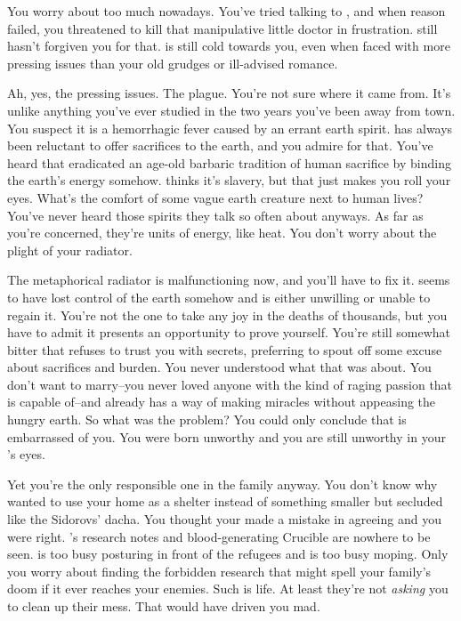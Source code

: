 \documentclass[char]{Pestilence}
\begin{document}
You worry about \cRebel{} too much nowadays. You've tried talking to \cRebel{\them}, and when reason failed, you threatened to kill that manipulative little doctor in frustration. \cRebel{} still hasn't forgiven you for that. \cRebel{\They} is still cold towards you, even when faced with more pressing issues than your old grudges or \cRebel{\their} ill-advised romance.

Ah, yes, the pressing issues. The plague. You're not sure where it came from. It's unlike anything you've ever studied in the two years you've been away from town. You suspect it is a hemorrhagic fever caused by an errant earth spirit. \cElder{\Parent} has always been reluctant to offer sacrifices to the earth, and you admire \cElder{\them} for that. You've heard that \cElder{\they} eradicated an age-old barbaric tradition of human sacrifice by binding the earth's energy somehow. \cRebel{} thinks it's slavery, but that just makes you roll your eyes. What's the comfort of some vague earth creature next to human lives? You've never heard those spirits they talk so often about anyways. As far as you're concerned, they're units of energy, like heat. You don't worry about the plight of your radiator. 

The metaphorical radiator is malfunctioning now, and you'll have to fix it. \cElder{\Parent} seems to have lost control of the earth somehow and is either unwilling or unable to regain it. You're not the one to take any joy in the deaths of thousands, but you have to admit it presents an opportunity to prove yourself. You're still somewhat bitter that \cElder{\Parent} refuses to trust you with \cElder{\their} secrets, preferring to spout off some excuse about sacrifices and burden. You never understood what that was about. You don't want to marry--you never loved anyone with the kind of raging passion that \cRebel{} is capable of--and \cElder{\Parent} already has a way of making miracles without appeasing the hungry earth. So what was the problem? You could only conclude that \cElder{\Parent} is embarrassed of you. You were born unworthy and you are still unworthy in your \cElder{\parent}'s eyes.

Yet you're the only responsible one in the family anyway. You don't know why \cOutsider{} wanted to use your home as a shelter instead of something smaller but secluded like the Sidorovs' dacha. You thought your \cElder{\parent} made a mistake in agreeing and you were right. \cRebel{}'s research notes and blood-generating Crucible are nowhere to be seen. \cElder{\Parent} is too busy posturing in front of the refugees and \cRebel{} is too busy moping. Only you worry about finding the forbidden research that might spell your family's doom if it ever reaches your enemies. Such is life. At least they're not \textit{asking} you to clean up their mess. That would have driven you mad.
\end{document}
